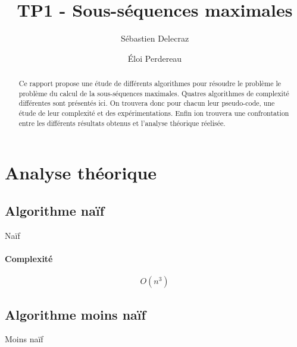 \documentclass[11pt, a4paper]{article}
\title{TP1 - Sous-séquences maximales}
\author{Sébastien Delecraz \and \'Eloi Perdereau}
\begin{document}
\maketitle

\begin{abstract}
  Ce rapport propose une étude de différents algorithmes pour résoudre le
  problème le problème du calcul de la sous-séquences maximales. Quatres
  algorithmes de complexité différentes sont présentés ici. On trouvera donc
  pour chacun leur pseudo-code, une étude de leur complexité et des
  expérimentations. Enfin ion trouvera une confrontation entre les différents
  résultats obtenus et l'analyse théorique réelisée.
\end{abstract}

\section{Analyse théorique}

\subsection{Algorithme naïf}

\begin{algorithm}
  \caption{Naïf}
\end{algorithm}
\paragraph{Complexité}
\[O(n^3)\]

\subsection{Algorithme moins naïf}

\begin{algorithm}
  \caption{Moins naïf}
\end{algorithm}
\end{document}
